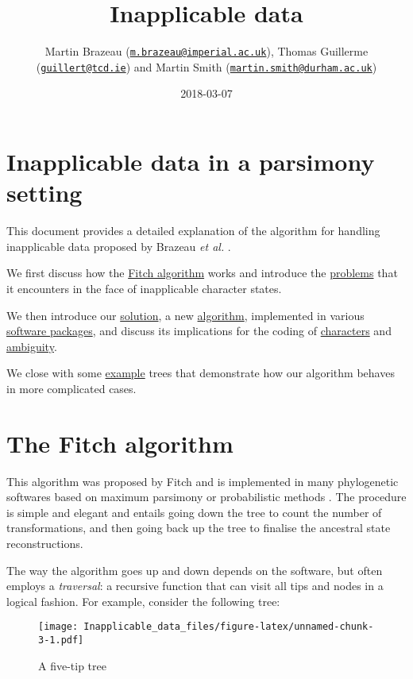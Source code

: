\documentclass[]{book}
\title{Inapplicable data}
\author{Martin Brazeau
(\href{mailto:m.brazeau@imperial.ac.uk}{\nolinkurl{m.brazeau@imperial.ac.uk}}),
Thomas Guillerme
(\href{mailto:guillert@tcd.ie}{\nolinkurl{guillert@tcd.ie}}) and Martin
Smith
(\href{mailto:martin.smith@durham.ac.uk}{\nolinkurl{martin.smith@durham.ac.uk}})}
\date{2018-03-07}
\theoremstyle{definition}
\theoremstyle{definition}
\theoremstyle{definition}
\theoremstyle{remark}
\begin{document}
\maketitle

{
\setcounter{tocdepth}{1}
\tableofcontents
}
\hypertarget{inapplicable-data-in-a-parsimony-setting}{%
\chapter*{Inapplicable data in a parsimony
setting}\label{inapplicable-data-in-a-parsimony-setting}}

This document provides a detailed explanation of the algorithm for
handling inapplicable data proposed by Brazeau \emph{et al.}
\citeyearpar{ThisStudy}.

We first discuss how the \href{../fitch.html}{Fitch algorithm} works and
introduce the \url{problems} that it encounters in the face of
inapplicable character states.

We then introduce our \href{solution.html}{solution}, a new
\href{algorithm.html}{algorithm}, implemented in various
\href{software.html}{software packages}, and discuss its implications
for the coding of \href{coding.html}{characters} and
\href{ambiguity.html}{ambiguity}.

We close with some \href{examples.html}{example} trees that demonstrate
how our algorithm behaves in more complicated cases.

\hypertarget{fitch}{%
\chapter{The Fitch algorithm}\label{fitch}}

This algorithm was proposed by Fitch \citeyearpar{Fitch1971} and is
implemented in many phylogenetic softwares based on maximum parsimony
\citep{swofford2001paup, Goloboff2016} or probabilistic methods
\citep{Ronquist2012mrbayes, Stamatakis2014}. The procedure is simple and
elegant and entails going down the tree to count the number of
transformations, and then going back up the tree to finalise the
ancestral state reconstructions.

The way the algorithm goes up and down depends on the software, but
often employs a \emph{traversal}: a recursive function that can visit
all tips and nodes in a logical fashion. For example, consider the
following tree:

\begin{figure}
\centering
\texttt{[image: Inapplicable\_data\_files/figure-latex/unnamed-chunk-3-1.pdf]}
\caption{\label{fig:unnamed-chunk-3}A five-tip tree}
\end{figure}
\end{document}
